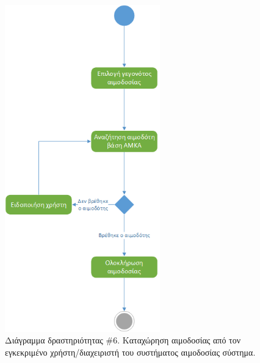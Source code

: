 				
		\begin{figure}[H]
		    \centering
		    \includegraphics[width=0.6\textwidth]{CompleteDonation.png}
		    \caption{Διάγραμμα δραστηριότητας \#6. Καταχώρηση αιμοδοσίας από τον εγκεκριμένο χρήστη/διαχειριστή του συστήματος αιμοδοσίας σύστημα.}
		    \label{fig:complete}
		\end{figure}
		
